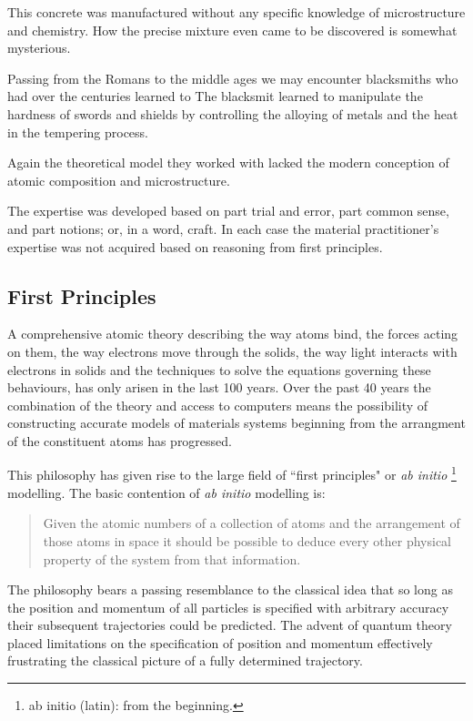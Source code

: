 This concrete was manufactured without any specific knowledge of microstructure and 
chemistry. How the precise mixture even came to be discovered is somewhat mysterious.

Passing from the Romans to the middle ages we may encounter blacksmiths 
who had over the centuries learned to 
The blacksmit learned to manipulate the hardness of swords 
and shields by controlling the alloying of metals and the 
heat in the tempering process. 

Again the theoretical model they worked with 
lacked the modern conception of atomic composition 
and microstructure.

%
The expertise was developed based on part trial and error, 
part common sense, and part notions; or, in a word, craft.
%
In each case the material practitioner's expertise 
was not acquired based on reasoning from first principles.

\subsection{First Principles}

A comprehensive atomic theory describing the way atoms bind, the forces acting on them, 
the way electrons move through the solids, the way light interacts with electrons in solids
and the techniques to solve the equations governing these behaviours, has only 
arisen in the last 100 years. 
%
Over the past 40 years the combination of the theory and access to computers 
means the possibility of constructing accurate models of materials 
systems beginning from the arrangment of the constituent atoms has
progressed. 
%

This philosophy has given rise to the large field of ``first principles" or {\it ab initio} 
\footnote{ab initio (latin): from the beginning.} modelling. 
%
The basic contention of {\it ab initio} modelling is:  

\begin{quote}
Given the atomic numbers of a collection of atoms 
and the arrangement of those atoms in space 
it should be possible to deduce every other 
physical property of the system from that information.
\end{quote}

The philosophy bears a passing resemblance to the classical idea
that so long as the position and momentum of all particles 
is specified with arbitrary accuracy their subsequent 
trajectories could be predicted. The advent of quantum theory
placed limitations on the specification of position and momentum
effectively frustrating the classical picture of a fully determined
trajectory. 

